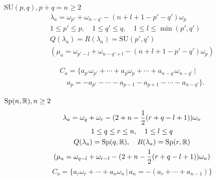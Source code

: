\documentclass[10pt]{beamer}
\begin{document}
\begin{frame}{$\mathrm{SU}(p,q), p+q = n \geq 2$}
\begin{gather*}
  \lambda_a=\omega_{p'} + \omega_{n-q'} - (n+l+1-p'-q')\omega_p   \\
  1\leq p' \leq p,\quad 1\leq q' \leq q,\quad 1\leq l \leq \min(p',q')\\
  Q(\lambda_a)=R(\lambda_a)=\mathrm{SU}(p',q') \\
  (  \mu_a = \omega_{p'-l}+\omega_{n-q'+l}-(n+l+1-p'-q')\omega_p)
\end{gather*}

\begin{multline*}
 C_a = \{a_{p'}\omega_{p'} + \cdots + a_p\omega_p + \cdots + a_{n-q'}\omega_{n-q'} \,|\, \\
\quad  a_p=-a_{p'}-\cdots -a_{p-1}-a_{p+1} - \cdots - a_{n-q'} \}.
\end{multline*}

\end{frame}

\begin{frame}{$\mathrm{Sp}(n,\mathbb{R}), n \geq 2$}
\begin{gather*}
  \lambda_a = \omega_q + \omega_r - (2+n-\frac{1}{2}(r+q-l+1))\omega_n\\
   1\leq q\leq r\leq n,\quad 1\leq l \leq q\\
   Q(\lambda_a) = \mathrm{Sp}(q,\mathbb{R}),\quad R(\lambda_a)= \mathrm{Sp}(r,\mathbb{R}) \\
   (\mu_a= \omega_{q-l} + \omega_{r-l} - (2+n-\frac{1}{2}(r+q-l+1))\omega_n)
\end{gather*}
\[
 C_a = \{ a_r\omega_r + \cdots + a_n\omega_n \,|\, a_n=-(a_r+\cdots + a_{n-1}) \}
\]
\end{frame}
\end{document}
